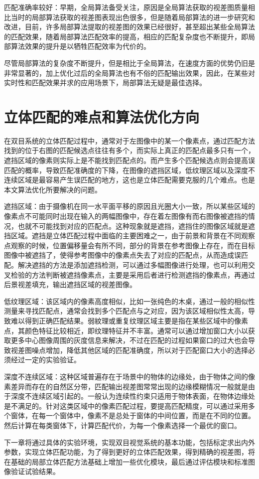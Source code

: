 匹配准确率较好：早期，全局算法备受关注，原因是全局算法获取的视差图质量相比当时的局部算法获取的视差图表现出色很多，但是随着局部算法的进一步研究和改进，目前，许多局部算法提取的视差图的效果已经很好，甚至超出某些全局算法的匹配效果，随着局部算法匹配效率的提高，相应的匹配复杂度也不断提升，即局部算法效果的提升是以牺牲匹配效率为代价的。

尽管局部算法的复杂度不断提升，但是相比于全局算法，在速度方面的优势仍旧是非常显著的，加上优化过后的全局算法也有不俗的匹配输出效果，因此，在某些对实时性和匹配效果并求的应用场景下，局部算法无疑是最佳选择。

\section{立体匹配的难点和算法优化方向}

在双目系统的立体匹配过程中，通常对于左图像中的某一个像素点，通过匹配方法找到的位于右图的匹配候选点往往有多个，而实际上真正的匹配点最多只有一个，遮挡区域的像素则实际上是不能找到匹配点的。而产生多个匹配候选点则会提高误匹配的概率，导致匹配准确度的下降，在图像的遮挡区域，低纹理区域以及深度不连续区域是最容易产生误匹配的地方，这也是立体匹配需要克服的几个难点。也是本文算法优化所要解决的问题。


遮挡区域：由于摄像机在同一水平面平移的原因且光圈大小一致，所以某些区域的像素点不可能同时出现在输入的两幅图像中，存在着左图像有而右图像被遮挡的情况，也就不可能找到对应的匹配点。这种现象就是遮挡，遮挡住的图像区域就是遮挡区域。遮挡是立体匹配过程中面临的主要困难之一，由于前景和背景在不同观察点观察的时候，位置偏移量会有所不同，部分的背景在参考图像上存在，而在目标图像中被遮挡了，使得参考图像中的像素点失去了对应的匹配点，从而造成误匹配。解决遮挡的方法是添加遮挡检测，可以通过多幅图像进行处理，也可以利用交叉检验的方法判断被遮挡像素点，主要是采用后者进行检测遮挡的像素点，再通过后景视差填充，输出遮挡区域的视差图像。 

低纹理区域：该区域内的像素高度相似，比如一张纯色的木桌，通过一般的相似性测量来寻找匹配点，通常会找到多个匹配点与之对应，因为该区域相似性太高，导致难以得到正确匹配结果。弱紋理或重复纹理区域主要是指在某些区域中的像素点，其颜色特征比较相近，即纹理特征并不丰富。通常可以通过增加窗口大小以获取更多中心图像周围的灰度信息来解决，不过在匹配的过程如果窗口的过大也会导致视差图噪点增加，降低其他区域的匹配准确度，所以对于匹配窗口大小的选择必须经过一定的实验验证。

深度不连续区域：这种区域普遍存在于场景中的物体的边缘处，由于物体之间的像素差异而存在的自然区分带，匹配输出视差图常常出现的边缘模糊情况一般就是由于深度不连续区域引起的。一般认为连续性约束只适用于物体表面，在物体边缘处是不满足的。针对这类区域中的像素匹配过程，要提高匹配精度，可以通过采用多个窗体，在每一个窗体中，像素不是总处于窗体的中间位置，而是在不同的位置。然后计算在每类窗体下，计算匹配代价，为每一个像素选择一个最优的窗口。 

下一章将通过具体的实验环境，实现双目视觉系统的基本功能，包括标定求出内外参数，实现立体匹配功能，为了得到更好的立体匹配效果，得到精确的视差图，将在基础的局部立体匹配方法基础上增加一些优化模块，最后通过评估模块和标准图像验证试验结果。
